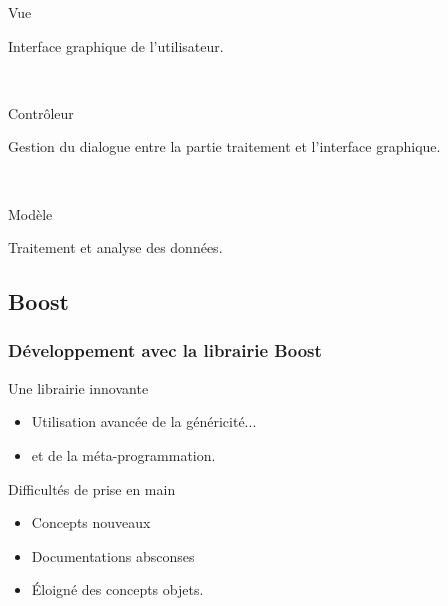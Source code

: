{\begin{minipage}{0.45\textwidth}
\begin{flushleft}
\begin{center}
\end{center}
\end{flushleft}
\end{minipage}
\begin{minipage}{0.45\textwidth}
\begin{flushright}
\begin{block}{Vue}
\begin{center}
Interface graphique de l'utilisateur.
\end{center}
\end{block}
~\\
\begin{block}{Contrôleur}
\begin{center}
Gestion du dialogue entre la partie traitement et l'interface graphique.
\end{center}
\end{block}
~\\
\begin{block}{Modèle}
\begin{center}
Traitement et analyse des données.
\end{center}
\end{block}
\end{flushright}
\end{minipage}
}

\subsection{Boost}
\frame
{
\frametitle{D\'eveloppement avec la librairie Boost}
\begin{block}{Une librairie innovante}
 \begin{itemize}
  \item Utilisation avancée de la généricité...
  \item et de la méta-programmation.
 \end{itemize}
\end{block}

\begin{block}{Difficultés de prise en main}
 \begin{itemize}
  \item Concepts nouveaux
  \item Documentations absconses
  \item \'Eloigné des concepts objets.
 \end{itemize}
\end{block}

}